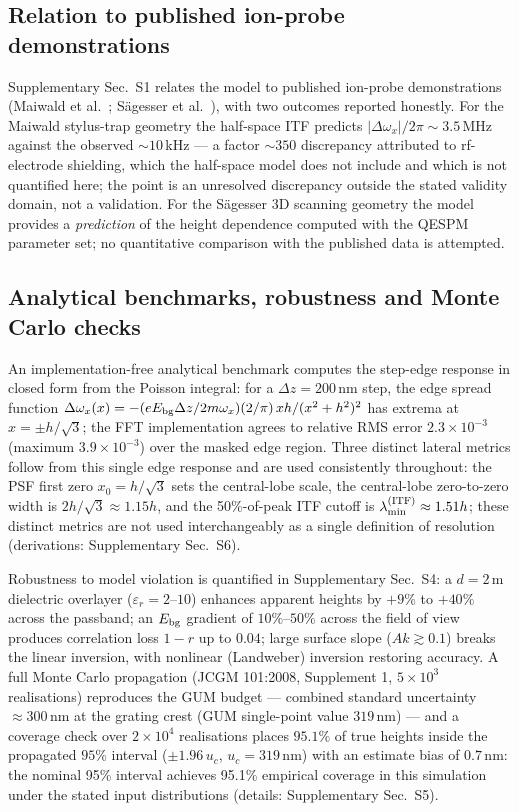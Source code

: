 \documentclass[12pt,a4paper]{article}
\begin{document}
\subsection{Relation to published ion-probe demonstrations}

Supplementary Sec.~S1 relates the model to published ion-probe
demonstrations (Maiwald et al.~\cite{maiwald2009stylus};
S{\"a}gesser et al.~\cite{sagesser2026scanning}), with two outcomes
reported honestly.  For the Maiwald stylus-trap geometry the half-space
ITF predicts $|\Delta\omega_x|/2\pi\sim3.5$\,MHz against the observed
$\sim10$\,kHz --- a factor $\sim350$ discrepancy attributed to
rf-electrode shielding, which the half-space model does not include and
which is not quantified here; the point is an unresolved discrepancy
outside the stated validity domain, not a validation.  For the
S{\"a}gesser 3D scanning geometry the model provides a \emph{prediction}
of the height dependence computed with the QESPM parameter set; no
quantitative comparison with the published data is attempted.

\subsection{Analytical benchmarks, robustness and Monte Carlo checks}

An implementation-free analytical benchmark computes the step-edge
response in closed form from the Poisson integral: for a
$\Delta z=200$\,nm step, the edge spread function
$\Delta\omega_x(x)=-(eE_{\rm bg}\Delta z/2m\omega_x)(2/\pi)\,xh/(x^2+h^2)^2$
has extrema at $x=\pm h/\sqrt{3}$; the FFT
implementation agrees to relative RMS error $2.3\times10^{-3}$ (maximum
$3.9\times10^{-3}$) over the masked edge region.  Three distinct lateral
metrics follow from this single edge response and are used consistently
throughout: the PSF first zero $x_0=h/\sqrt{3}$ sets the central-lobe
scale, the central-lobe zero-to-zero width is
$2h/\sqrt3\approx1.15h$, and the 50\%-of-peak ITF cutoff is
$\lambda_{\min}^{\rm(ITF)}\approx1.51h$; these distinct metrics are not
used interchangeably as a single definition of resolution (derivations:
Supplementary Sec.~S6).

Robustness to model violation is quantified in Supplementary Sec.~S4: a
$d=2$\,\textmu m dielectric overlayer ($\varepsilon_r=2$--$10$) enhances
apparent heights by $+9\%$ to $+40\%$ across the passband; an $E_{\rm bg}$
gradient of $10\%$--$50\%$ across the field of view produces correlation
loss $1-r$ up to $0.04$; large surface slope ($Ak\gtrsim0.1$) breaks the
linear inversion, with nonlinear (Landweber) inversion restoring accuracy.
A full Monte Carlo propagation (JCGM 101:2008, Supplement 1,
$5\times10^3$ realisations) reproduces the GUM budget --- combined
standard uncertainty $\approx300$\,nm at the grating crest (GUM
single-point value $319$\,nm) --- and a coverage check over
$2\times10^4$ realisations places $95.1\%$ of true heights inside the
propagated $95\%$ interval ($\pm1.96\,u_c$, $u_c=319$\,nm) with an
estimate bias of $0.7$\,nm: the nominal 95\% interval achieves 95.1\%
empirical coverage in this simulation under the stated input
distributions (details: Supplementary Sec.~S5).
\end{document}
